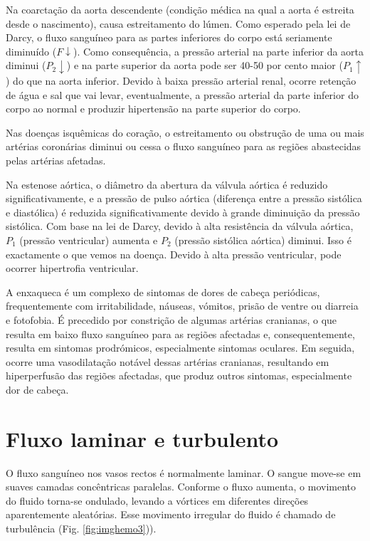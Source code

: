 \documentclass[
  portuguese,
  ]{book}
\begin{document}
Na coarctação da aorta descendente (condição médica na qual a aorta é estreita desde o nascimento), causa estreitamento do lúmen. Como esperado pela lei de Darcy, o fluxo sanguíneo para as partes inferiores do corpo está seriamente diminuído (\(F \downarrow\)). Como consequência, a pressão arterial na parte inferior da aorta diminui (\(P_2 \downarrow\)) e na parte superior da aorta pode ser 40-50 por cento maior (\(P_1 \uparrow\)) do que na aorta inferior. Devido à baixa pressão arterial renal, ocorre retenção de água e sal que vai levar, eventualmente, a pressão arterial da parte inferior do corpo ao normal e produzir hipertensão na parte superior do corpo.

Nas doenças isquêmicas do coração, o estreitamento ou obstrução de uma ou mais artérias coronárias diminui ou cessa o fluxo sanguíneo para as regiões abastecidas pelas artérias afetadas.

Na estenose aórtica, o diâmetro da abertura da válvula aórtica é reduzido significativamente, e a pressão de pulso aórtica (diferença entre a pressão sistólica e diastólica) é reduzida significativamente devido à grande diminuição da pressão sistólica. Com base na lei de Darcy, devido à alta resistência da válvula aórtica, \(P_1\) (pressão ventricular) aumenta e \(P_2\) (pressão sistólica aórtica) diminui. Isso é exactamente o que vemos na doença. Devido à alta pressão ventricular, pode ocorrer hipertrofia ventricular.

A enxaqueca é um complexo de sintomas de dores de cabeça periódicas, frequentemente com irritabilidade, náuseas, vómitos, prisão de ventre ou diarreia e fotofobia. É precedido por constrição de algumas artérias cranianas, o que resulta em baixo fluxo sanguíneo para as regiões afectadas e, consequentemente, resulta em sintomas prodrómicos, especialmente sintomas oculares. Em seguida, ocorre uma vasodilatação notável dessas artérias cranianas, resultando em hiperperfusão das regiões afectadas, que produz outros sintomas, especialmente dor de cabeça.

\hypertarget{fluxo-laminar-e-turbulento}{%
\section{Fluxo laminar e turbulento}\label{fluxo-laminar-e-turbulento}}

O fluxo sanguíneo nos vasos rectos é normalmente laminar. O sangue move-se em suaves camadas concêntricas paralelas. Conforme o fluxo aumenta, o movimento do fluido torna-se ondulado, levando a vórtices em diferentes direções aparentemente aleatórias. Esse movimento irregular do fluido é chamado de turbulência (Fig. \ref{fig:imghemo3})).
\end{document}
